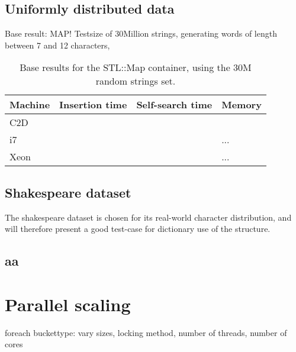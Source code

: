 \subsection{Uniformly distributed data}
Base result: MAP! Testsize of 30Million strings, generating words of length between 7 and 12 characters,

\begin{table}[h!]
    \centering
    \begin{tabular}[here]{ l l l l }
        \hline
        Machine   & Insertion time & Self-search time & Memory  \\\hline
        C2D       &                &                  &         \\\hline
        i7        &                &                  & ...     \\\hline
        Xeon      &                &                  & ...     \\\hline
    \end{tabular}
    \caption{Base results for the STL::Map container, using the 30M random strings set.}
    \label{tab:cpucpecs}
\end{table}



\subsection{Shakespeare dataset}
The shakespeare dataset is chosen for its real-world character distribution, and will
therefore present a good test-case for dictionary use of the structure.
\subsection{aa}

\section{Parallel scaling}
foreach buckettype: vary sizes, locking method,
                    number of threads, number of cores

